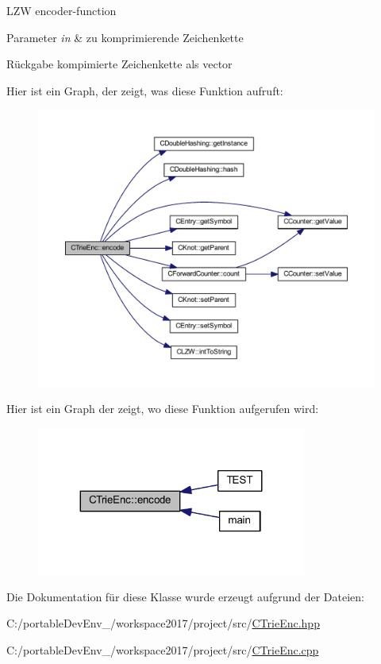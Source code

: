 L\+ZW encoder-\/function 
\begin{DoxyParams}{Parameter}
{\em in} & zu komprimierende Zeichenkette \\
\hline
\end{DoxyParams}
\begin{DoxyReturn}{Rückgabe}
kompimierte Zeichenkette als vector 
\end{DoxyReturn}
Hier ist ein Graph, der zeigt, was diese Funktion aufruft\+:
\nopagebreak
\begin{figure}[H]
\begin{center}
\leavevmode
\includegraphics[width=350pt]{class_c_trie_enc_a14832d9694f7aa5ba9d7d32d3a3c0793_cgraph}
\end{center}
\end{figure}
Hier ist ein Graph der zeigt, wo diese Funktion aufgerufen wird\+:
\nopagebreak
\begin{figure}[H]
\begin{center}
\leavevmode
\includegraphics[width=251pt]{class_c_trie_enc_a14832d9694f7aa5ba9d7d32d3a3c0793_icgraph}
\end{center}
\end{figure}


Die Dokumentation für diese Klasse wurde erzeugt aufgrund der Dateien\+:\begin{DoxyCompactItemize}
\item 
C\+:/portable\+Dev\+Env\+\_/workspace2017/project/src/\hyperlink{_c_trie_enc_8hpp}{C\+Trie\+Enc.\+hpp}\item 
C\+:/portable\+Dev\+Env\+\_/workspace2017/project/src/\hyperlink{_c_trie_enc_8cpp}{C\+Trie\+Enc.\+cpp}\end{DoxyCompactItemize}
